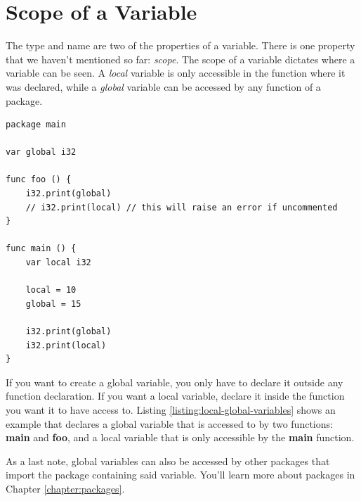 \documentclass[11pt,fleqn,openany]{book} %
\begin{document}
\section{Scope of a Variable}


The type and name are two of the properties of a variable. There is one property that we haven't mentioned so far: \emph{scope}. The scope of a variable dictates where a variable can be seen. A \emph{local} variable is only accessible in the function where it was declared, while a \emph{global} variable can be accessed by any function of a package.

\begin{lstlisting}[caption={Usage of Local and Global Variables},captionpos=b,label={listing:local-global-variables}]
package main

var global i32

func foo () {
    i32.print(global)
    // i32.print(local) // this will raise an error if uncommented
}

func main () {
    var local i32
    
    local = 10
    global = 15
    
    i32.print(global)
    i32.print(local)
}
\end{lstlisting}

If you want to create a global variable, you only have to declare it outside any function declaration. If you want a local variable, declare it inside the function you want it to have access to. Listing \ref{listing:local-global-variables} shows an example that declares a global variable that is accessed to by two functions: \textbf{main} and \textbf{foo}, and a local variable that is only accessible by the \textbf{main} function.

As a last note, global variables can also be accessed by other packages that import the package containing said variable. You'll learn more about packages in Chapter \ref{chapter:packages}.
\end{document}
